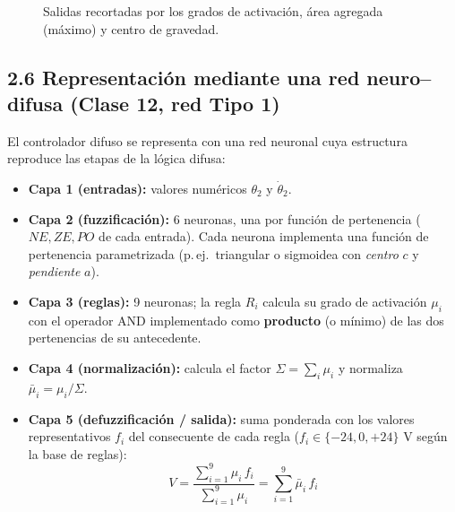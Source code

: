 \documentclass[11pt,a4paper]{article}
\begin{document}
\begin{figure}[h]
\centering
{}
\caption{Salidas recortadas por los grados de activación, área agregada (máximo) y centro de gravedad.}
\end{figure}

\subsection*{2.6 Representación mediante una red neuro--difusa (Clase 12, red Tipo 1)}

El controlador difuso se representa con una red neuronal cuya estructura reproduce las etapas de la lógica difusa:

\begin{itemize}[itemsep=1pt]
\item \textbf{Capa 1 (entradas):} valores numéricos $\theta_2$ y $\dot\theta_2$.
\item \textbf{Capa 2 (fuzzificación):} 6 neuronas, una por función de pertenencia ($NE,ZE,PO$ de cada entrada). Cada neurona implementa una función de pertenencia parametrizada (p.\,ej.\ triangular o sigmoidea con \emph{centro} $c$ y \emph{pendiente} $a$).
\item \textbf{Capa 3 (reglas):} 9 neuronas; la regla $R_i$ calcula su grado de activación $\mu_i$ con el operador AND implementado como \textbf{producto} (o mínimo) de las dos pertenencias de su antecedente.
\item \textbf{Capa 4 (normalización):} calcula el factor $\Sigma=\sum_i\mu_i$ y normaliza $\bar\mu_i=\mu_i/\Sigma$.
\item \textbf{Capa 5 (defuzzificación / salida):} suma ponderada con los valores representativos $f_i$ del consecuente de cada regla ($f_i\in\{-24,0,+24\}$ V según la base de reglas):
\[
V=\frac{\sum_{i=1}^{9}\mu_i\,f_i}{\sum_{i=1}^{9}\mu_i}=\sum_{i=1}^{9}\bar\mu_i\,f_i
\]
\end{itemize}
\end{document}
